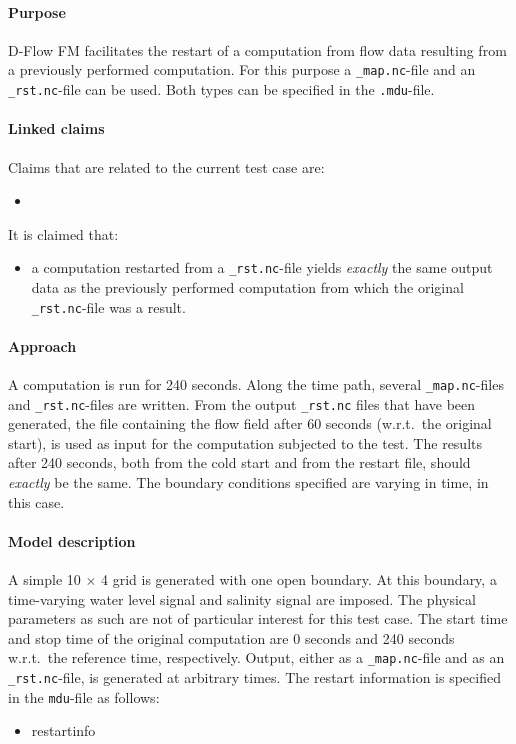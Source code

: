 


\paragraph*{Purpose}
D-Flow FM facilitates the restart of a computation from flow data resulting from a previously performed computation. For this purpose a \texttt{\_map.nc}-file and an \texttt{\_rst.nc}-file can be used. Both types can be specified in the \texttt{.mdu}-file. 


\paragraph*{Linked claims}
Claims that are related to the current test case are:
\begin{itemize}
\item {}
\end{itemize}
It is claimed that:
\begin{itemize}
\item a computation restarted from a \texttt{\_rst.nc}-file yields \emph{exactly} the same output data as the previously performed computation from which the original \texttt{\_rst.nc}-file was a result.
\end{itemize}


\paragraph*{Approach}
A computation is run for 240 seconds. Along the time path, several \texttt{\_map.nc}-files and \texttt{\_rst.nc}-files are written. From the output \texttt{\_rst.nc} files that have been generated, the file containing the flow field after 60 seconds (w.r.t.\ the original start), is used as input for the computation subjected to the test. The results after 240 seconds, both from the cold start and from the restart file, should \emph{exactly} be the same. The boundary conditions specified are varying in time, in this case.



\paragraph*{Model description}
A simple 10 $\times$ 4 grid is generated with one open boundary. At this boundary, a time-varying water level signal and salinity signal are imposed. The physical parameters as such are not of particular interest for this test case. The start time and stop time of the original computation are 0 seconds and 240 seconds w.r.t.\ the reference time, respectively. Output, either as a \texttt{\_map.nc}-file and as an \texttt{\_rst.nc}-file, is generated at arbitrary times. The restart information is specified in the \texttt{mdu}-file as follows:
\begin{itemize}
\item {restartinfo}
\end{itemize}


